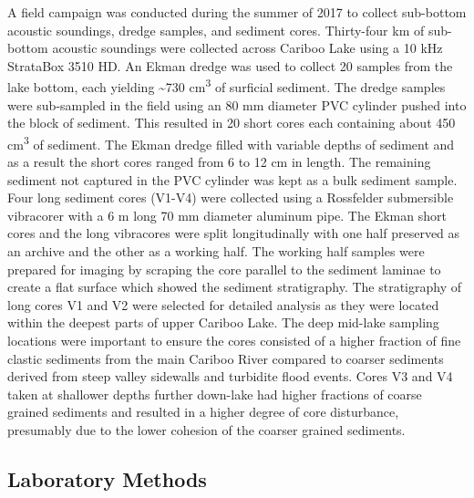 \documentclass[Royal,times,doublespace,sageh]{sagej}
\begin{document}
A field campaign was conducted during the summer of 2017 to collect
sub-bottom acoustic soundings, dredge samples, and sediment cores.
Thirty-four km of sub-bottom acoustic soundings were collected across
Cariboo Lake using a 10 kHz StrataBox 3510 HD. An Ekman dredge was used
to collect 20 samples from the lake bottom, each yielding
\textasciitilde730 cm\textsuperscript{3} of surficial sediment. The
dredge samples were sub-sampled in the field using an 80 mm diameter PVC
cylinder pushed into the block of sediment. This resulted in 20 short
cores each containing about 450 cm\textsuperscript{3} of sediment. The
Ekman dredge filled with variable depths of sediment and as a result the
short cores ranged from 6 to 12 cm in length. The remaining sediment not
captured in the PVC cylinder was kept as a bulk sediment sample. Four
long sediment cores (V1-V4) were collected using a Rossfelder
submersible vibracorer with a 6 m long 70 mm diameter aluminum pipe. The
Ekman short cores and the long vibracores were split longitudinally with
one half preserved as an archive and the other as a working half. The
working half samples were prepared for imaging by scraping the core
parallel to the sediment laminae to create a flat surface which showed
the sediment stratigraphy. The stratigraphy of long cores V1 and V2 were
selected for detailed analysis as they were located within the deepest
parts of upper Cariboo Lake. The deep mid-lake sampling locations were
important to ensure the cores consisted of a higher fraction of fine
clastic sediments from the main Cariboo River compared to coarser
sediments derived from steep valley sidewalls and turbidite flood
events. Cores V3 and V4 taken at shallower depths further down-lake had
higher fractions of coarse grained sediments and resulted in a higher
degree of core disturbance, presumably due to the lower cohesion of the
coarser grained sediments.

\hypertarget{laboratory-methods}{%
\subsection{Laboratory Methods}\label{laboratory-methods}}
\end{document}
